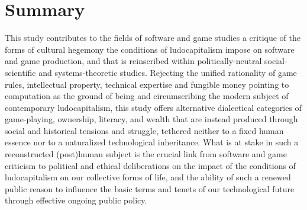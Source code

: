 \section*{Summary}
This study contributes to the fields of software and game studies a critique of the forms of cultural hegemony the conditions of ludocapitalism impose on software and game production, and that is reinscribed within politically-neutral social-scientific and systems-theoretic studies. Rejecting the unified rationality of game rules, intellectual property, technical expertise and fungible money pointing to computation as the ground of being and circumscribing the modern subject of contemporary ludocapitalism, this study offers alternative dialectical categories of game-playing, ownership, literacy, and wealth that are instead produced through social and historical tensions and struggle, tethered neither to a fixed human essence nor to a naturalized technological inheritance. What is at stake in such a reconstructed (post)human subject is the crucial link from software and game criticism to political and ethical deliberations on the impact of the conditions of ludocapitalism on our collective forms of life, and the ability of such a renewed public reason to influence the basic terms and tenets of our technological future through effective ongoing public policy.